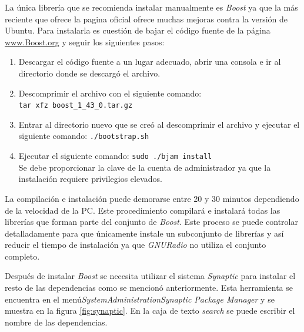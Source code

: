 La \'unica librer\'ia que se recomienda instalar manualmente es \emph{Boost} ya que la m\'as reciente que ofrece la pagina oficial
ofrece muchas mejoras contra la versi\'on de Ubuntu. Para instalarla es cuesti\'on de bajar el c\'odigo fuente de la p\'agina \url{www.Boost.org} y seguir los siguientes
pasos:

\begin{enumerate}
  \item Descargar el c\'odigo fuente a un lugar adecuado, abrir una consola e
  ir al directorio donde se descarg\'o el archivo.
  \item Descomprimir el archivo con el siguiente comando:\\
  \verb|tar xfz boost_1_43_0.tar.gz|
  \item Entrar al directorio nuevo que se cre\'o al descomprimir el archivo y
  ejecutar el siguiente comando: \verb|./bootstrap.sh|
  \item Ejecutar el siguiente comando: \verb|sudo ./bjam install|\\ Se debe
  proporcionar la clave de la cuenta de administrador ya que la instalaci\'on
  requiere privilegios elevados.
\end{enumerate}

La compilaci\'on e instalaci\'on puede demorarse entre 20 y 30 minutos dependiendo de la velocidad de la PC. Este procedimiento
compilar\'a e instalar\'a todas las librer\'ias que forman parte del conjunto de \emph{Boost}. Este proceso se puede controlar
detalladamente para que \'unicamente instale un subconjunto de librer\'ias y as\'i reducir el tiempo de instalaci\'on ya
que \emph{GNURadio} no utiliza el conjunto completo.

Despu\'es de instalar \emph{Boost} se necesita utilizar el sistema \emph{Synaptic} para instalar el resto de las dependencias
como se mencion\'o anteriormente. Esta herramienta se encuentra en el men\'u\emph{SystemAdministrationSynaptic
Package Manager} y se muestra en la figura \ref{fig:synaptic}. En la caja de texto \emph{search} se puede escribir el nombre
de las dependencias.

